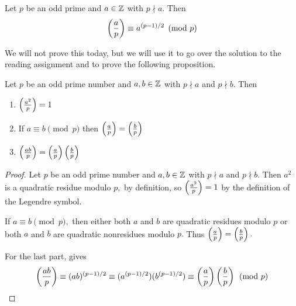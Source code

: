 \documentclass[letterpaper, 11 pt]{ximera}
\theoremstyle{definition}
\begin{document}
\begin{thm*}\label{thm:euler-quads}
    Let $p$ be an odd prime and $a\in\mathbb Z$ with $p\nmid a.$ Then \[\left(\frac{a}{p}\right)\equiv a^{(p-1)/2}\pmod{p}\]
\end{thm*}

We will not prove this today, but we will use it to go over the solution to the reading assignment and to prove the following proposition.

\begin{prop*}[Proposition 4.5]\label{prop:legendre-facts}
	Let $p$ be an odd prime number and $a,b\in\mathbb Z$ with $p\nmid a$ and $p\nmid b.$ Then 
	\begin{enumerate}[label=(\alph*)]
		\item $\left(\frac{a^2}{p}\right)=1$ \label{squares-are-square}
		\item If $a\equiv b\pmod{p}$ then $\left(\frac{a}{p}\right)=\left(\frac{b}{p}\right)$ \label{legendre-respects-mod}
		\item $\left(\frac{ab}{p}\right)=\left(\frac{a}{p}\right)\left(\frac{b}{p}\right)$ \label{legendre-mult}
	\end{enumerate}
\end{prop*}


\begin{proof}
    Let $p$ be an odd prime number and $a,b\in\mathbb Z$ with $p\nmid a$ and $p\nmid b.$ Then $a^2$ is a quadratic residue modulo $p,$ by definition, so $\left(\frac{a^2}{p}\right)=1$ by the definition of the Legendre symbol.

    If $a\equiv b\pmod{p},$ then either both $a$ and $b$ are quadratic residues modulo $p$ or both $a$ and $b$ are quadratic nonresidues modulo $p.$ Thus $\left(\frac{a}{p}\right)=\left(\frac{b}{p}\right).$

    For the last part,  gives \[\left(\frac{ab}{p}\right)\equiv (ab)^{(p-1)/2}\equiv (a^{(p-1)/2})(b^{(p-1)/2})\equiv \left(\frac{a}{p}\right)\left(\frac{b}{p}\right)\pmod{p}\]
\end{proof}
\end{document}
